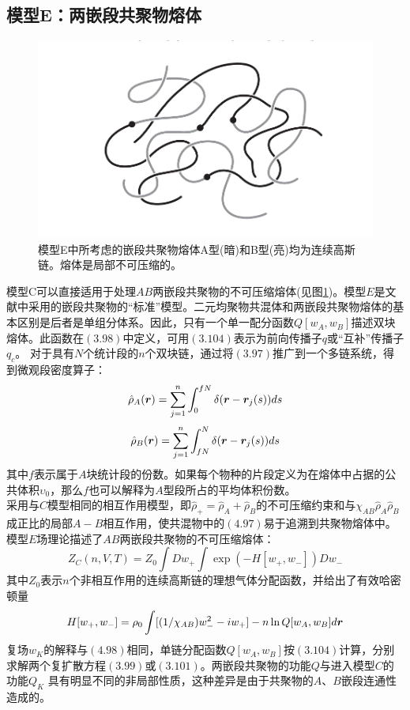 \subsection{模型E：两嵌段共聚物熔体}

\begin{figure}[H]
	\centering   
	\includegraphics[width=12cm]{./figures/2.png}
	\caption{模型E中所考虑的嵌段共聚物熔体A型(暗)和B型(亮)均为连续高斯链。熔体是局部不可压缩的。}
	\label{模型E}
\end{figure}
模型C可以直接适用于处理$AB$两嵌段共聚物的不可压缩熔体(见图\ref{模型E})。模型$E$是文献中采用的嵌段共聚物的“标准”模型。二元均聚物共混体和两嵌段共聚物熔体的基本区别是后者是单组分体系。因此，只有一个单一配分函数$Q[w_{A},w_{B}]$描述双块熔体。此函数在$(3.98)$中定义，可用$(3.104)$表示为前向传播子$q$或“互补”传播子$q_{c}$。 对于具有$N$个统计段的$n$个双块链，通过将$(3.97)$推广到一个多链系统，得到微观段密度算子：\\
\begin{equation}
\hat{ \rho }_{A}(\bm{r})=\sum_{j=1}^{n} \int _{0}^{fN}  \delta (\bm{r}-\bm{r}_{j}(s))d s
\end{equation}
\begin{equation}
\hat{ \rho }_{B}(\bm{r})=\sum_{j=1}^{n} \int _{fN}^{N} \delta (\bm{r}-\bm{r}_{j}(s))d s 
\end{equation}
其中$f$表示属于$A$块统计段的份数。如果每个物种的片段定义为在熔体中占据的公共体积$\upsilon_0$，那么$f$也可以解释为$A$型段所占的平均体积份数。\\

采用与$C$模型相同的相互作用模型，即$\hat{\rho}_{+}=\hat{\rho}_{A}+\hat{\rho}_{B}$的不可压缩约束和与$\chi_{AB} \hat{\rho}_{A} \hat{\rho}_{B}$成正比的局部$A-B$相互作用，使共混物中的$(4.97)$易于追溯到共聚物熔体中。模型$E$场理论描述了$AB$两嵌段共聚物的不可压缩熔体：\\
\begin{equation}
Z_{C}(n,V,T)=Z_{0} \int D w_{+} \int  \exp (-H[w_{+},w_{-}])D w_{-}
\end{equation}
其中$Z_0$表示$n$个非相互作用的连续高斯链的理想气体分配函数，并给出了有效哈密顿量\\
\begin{equation}
H[ w_{+}, w_{-}]= \rho_{0} \int  [(1/\chi_{AB})w_{-}^{2}-i w_{+}]-n \ln Q[w_{A},w_{B}]d \bm{r}
\end{equation}
复场$w_{K}$的解释与$(4.98)$相同，单链分配函数$Q[w_{A},w_{B}]$按$(3.104)$计算，分别求解两个复扩散方程$(3.99)$或$(3.101)$。两嵌段共聚物的功能$Q$与进入模型$C$的功能$Q_{K}$ 具有明显不同的非局部性质，这种差异是由于共聚物的$A$、$B$嵌段连通性造成的。\\

